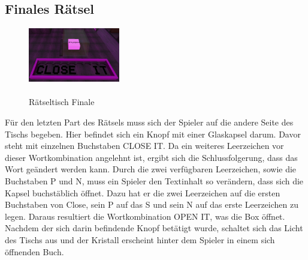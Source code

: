 \subsection{Finales Rätsel}
\begin{figure}
	\vspace*{-0.5cm}
	\includegraphics[width=4cm]{Pictures/Tisch4}
	\caption{\\ \noindent Rätseltisch Finale}
	\vspace*{-0.5cm}
	\label{fig:tisch4}
\end{figure}
Für den letzten Part des Rätsels muss sich der Spieler auf die andere Seite des Tischs begeben. Hier befindet sich ein Knopf mit einer Glaskapsel darum. Davor steht mit einzelnen Buchstaben \dq CLOSE  IT\dq. Da ein weiteres Leerzeichen vor dieser Wortkombination angelehnt ist, ergibt sich die Schlussfolgerung, dass das Wort geändert werden kann. Durch die zwei verfügbaren Leerzeichen, sowie die Buchstaben P und N, muss ein Spieler den Textinhalt so verändern, dass sich die Kapsel buchstäblich öffnet. Dazu hat er die zwei Leerzeichen auf die ersten Buchstaben von Close, sein P auf das S und sein N auf das erste Leerzeichen zu legen. Daraus resultiert die Wortkombination \dq OPEN IT\dq, was die Box öffnet. Nachdem der sich darin befindende Knopf betätigt wurde, schaltet sich das Licht des Tischs aus und der Kristall erscheint hinter dem Spieler in einem sich öffnenden Buch.
\noindent
